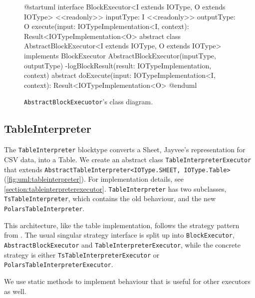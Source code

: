 \begin{figure}
	\begin{plantuml}
		@startuml
		interface BlockExecutor<I extends IOType, O extends IOType> {
				<<readonly>> inputType: I
				<<readonly>> outputType: O
				execute(input: IOTypeImplementation<I\>, context): Result<IOTypeImplementation<O\>>
			}
		abstract class AbstractBlockExecutor<I extends IOType, O extends IOType> implements BlockExecutor {
				AbstractBlockExecutor(inputType, outputType)
				-logBlockResult(result: IOTypeImplementation, context)
				{abstract} doExecute(input: IOTypeImplementation<I\>, context): Result<IOTypeImplementation<O>\>
			}
		@enduml
	\end{plantuml}
	\caption{\Verb|AbstractBlockExecuotor|'s  class diagram.}
	\label{fig:uml:abstractblockexecutor}
\end{figure}

\subsection{TableInterpreter}
The \Verb|TableInterpreter| blocktype converts a Sheet, Jayvee's representation for \ac{CSV} data, into a Table.
We create an abstract class \Verb|TableInterpreterExecutor| that extends \Verb|AbstractTableInterpreter<IOType.SHEET, IOType.Table>| (\ref{fig:uml:tableinterpreter}).
For implementation details, see \ref{section:tableinterpreterexecutor}.
\Verb|TableInterpreter| has two subclasses, \Verb|TsTableInterpreter|, which contains the old behaviour, and the new \Verb|PolarsTableInterpreter|.

This architecture, like the table implementation, follows the strategy pattern from \autocite{Dooley2024}.
The usual singular strategy interface is split up into \Verb|BlockExecutor|, \Verb|AbstractBlockExecutor| and \Verb|TableInterpreterExecutor|, while the concrete strategy is either \Verb|TsTableInterpreterExecutor| or \Verb|PolarsTableInterpreterExecutor|.

We use static methods to implement behaviour that is useful for other executors as well.

